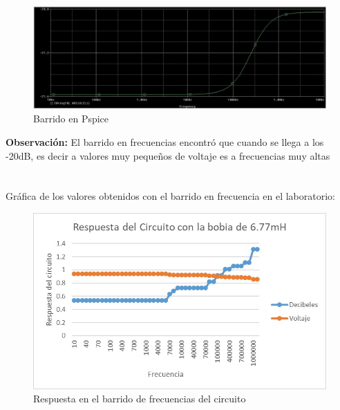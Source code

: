 \documentclass[12pt,letterpaper]{article}     %
\begin{document}
\begin{figure}[h!]
\centering
\includegraphics[width=5in]{Salida}
\caption{Barrido en Pspice}
\end{figure}

\textbf{Observación:}
El barrido en frecuencias encontró que cuando se llega a los -20dB, es decir a valores muy pequeños de voltaje es a frecuencias muy altas \\\\\\

Gráfica de los valores obtenidos con el barrido en frecuencia en el laboratorio:
\begin{figure}[h!]
\centering
\includegraphics[width=5in]{Grafica}
\caption{Respuesta en el barrido de frecuencias del circuito}
\end{figure}
\end{document}
